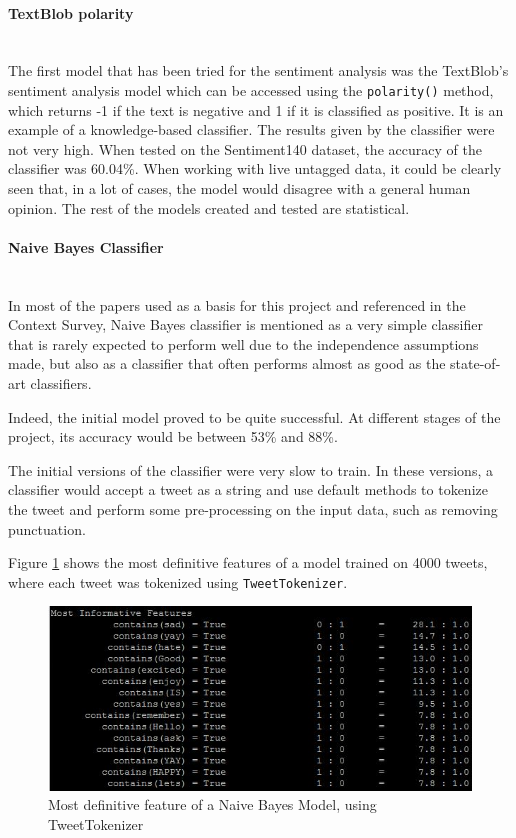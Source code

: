 \paragraph{TextBlob polarity} \mbox{}\\
The first model that has been tried for the sentiment analysis was the TextBlob's sentiment analysis model which can be accessed using the \texttt{polarity()} method, which returns -1 if the text is negative and 1 if it is classified as positive. It is an example of a knowledge-based classifier. The results given by the classifier were not very high. When tested on the Sentiment140 dataset, the accuracy of the classifier was 60.04\%. When working with live untagged data, it could be clearly seen that, in a lot of cases, the model would disagree with a general human opinion. The rest of the models created and tested are statistical. 

\paragraph{Naive Bayes Classifier}\mbox{}\\
In most of the papers used as a basis for this project and referenced in the Context Survey, Naive Bayes classifier is mentioned as a very simple classifier that is rarely expected to perform well due to the independence assumptions made, but also as a classifier that often performs almost as good as the state-of-art classifiers.

Indeed, the initial model proved to be quite successful. At different stages of the project, its accuracy would be between 53\% and 88\%.

The initial versions of the classifier were very slow to train. In these versions, a classifier would accept a tweet as a string and use default methods to tokenize the tweet and perform some pre-processing on the input data, such as removing punctuation. 

Figure \ref{fig:nb4000_twtok} shows the most definitive features of a model trained on 4000 tweets, where each tweet was tokenized using \texttt{TweetTokenizer}.  

\begin{figure}
    \centering
    \includegraphics[width=\textwidth]{NB4000_tw_tokenizer}
    \caption{Most definitive feature of a Naive Bayes Model, using TweetTokenizer}
    \label{fig:nb4000_twtok}
\end{figure}

